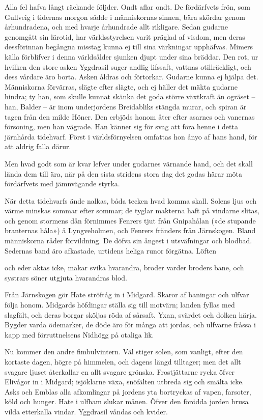 

Alla fel hafva långt räckande följder. Ondt aflar ondt. De fördärfvets
frön, som Gullveig i tidernas morgon sådde i människornas sinnen, bära
skördar genom århundradena, och med hvarje århundrade allt rikligare.
Sedan gudarne genomgått sin lärotid, har världsstyrelsen varit präglad
af visdom, men deras dessförinnan begångna misstag kunna ej till sina
värkningar upphäfvas. Mimers källa förblifver i denna världsålder
sjunken djupt under sina bräddar. Den rot, ur hvilken den store asken
Yggdrasil suger andlig lifssaft, vattnas otillräckligt, och dess vårdare
äro borta. Asken åldras och förtorkar. Gudarne kunna ej hjälpa det.
Människorna förvärras, slägte efter slägte, och ej häller det mäkta
gudarne hindra; ty han, som skulle kunnat skänka det goda större
växtkraft än ogräset -- han, Balder -- är inom underjordens Breidabliks
stängda murar, och spiran är tagen från den milde Höner. Den erbjöds
honom åter efter asarnes och vanernas försoning, men han vägrade. Han
känner sig för svag att föra henne i detta järnhårda tidehvarf. Först i
världsförnyelsen omfattas hon ånyo af hans hand, för att aldrig falla
därur.

Men hvad godt som är kvar lefver under gudarnes värnande hand, och det
skall lända dem till ära, när på den sista stridens stora dag det godas
härar möta fördärfvets med jämnvägande styrka.

När detta tidehvarfs ände nalkas, båda tecken hvad komma skall. Solens
ljus och värme minskas sommar efter sommar; de tyglar makterna haft på
vindarne slitas, och genom stormens dån förnimmes Fenrers tjut från
Gnipahålan (»de stupande branternas håla») å Lyngveholmen, och Fenrers
fränders från Järnskogen. Bland människorna råder förvildning. De döfva
sin ångest i utsväfningar och blodbad. Sedernas band äro afkastade,
urtidens heliga runor förgätna. Löften

och eder aktas icke, makar svika hvarandra, broder varder broders bane,
och systrars söner utgjuta hvarandras blod.

Från Järnskogen gör Hate ströftåg in i Midgard. Skaror af baningar och
ulfvar följa honom. Midgards höfdingar ställa sig till motvärn; landen
fyllas med slagfält, och deras borgar sköljas röda af sårsaft. Yxan,
svärdet och dolken härja. Bygder varda ödemarker, de döde äro för många
att jordas, och ulfvarne fråssa i kapp med förruttnelsens Nidhögg på
otaliga lik.

Nu kommer den andre fimbulvintern. Väl stiger solen, som vanligt, efter
den kortaste dagen, högre på himmelen, och dagens längd tilltager; men
det allt svagare ljuset återkallar en allt svagare grönska.
Frostjättarne rycka öfver Elivågor in i Midgard; isjöklarne växa,
snöfälten utbreda sig och smälta icke. Asks och Emblas alla afkomlingar
på jordens yta bortryckas af vapen, farsoter, köld och hunger. Hate i
ulfham slukar månen. Öfver den förödda jorden brusa vilda etterkalla
vindar. Yggdrasil våndas och kvider.

